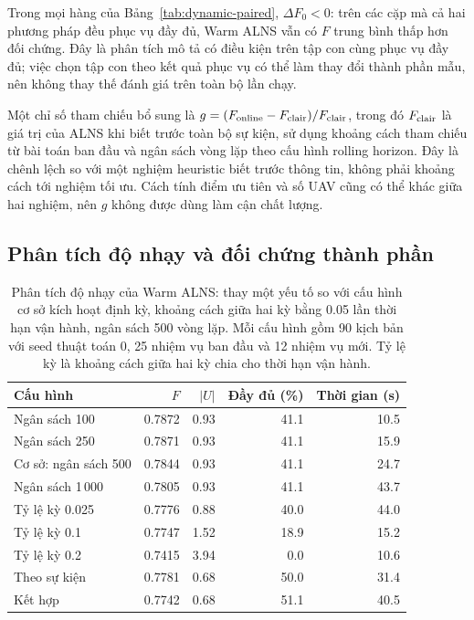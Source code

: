 \documentclass[11pt,a4paper]{article}
\begin{document}
Trong mọi hàng của Bảng~\ref{tab:dynamic-paired}, $\Delta F_0<0$: trên các cặp mà cả hai phương pháp đều phục vụ đầy đủ, Warm ALNS vẫn có $F$ trung bình thấp hơn đối chứng. Đây là phân tích mô tả có điều kiện trên tập con cùng phục vụ đầy đủ; việc chọn tập con theo kết quả phục vụ có thể làm thay đổi thành phần mẫu, nên không thay thế đánh giá trên toàn bộ lần chạy.

Một chỉ số tham chiếu bổ sung là $g=(F_{\rm online}-F_{\rm clair})/F_{\rm clair}$, trong đó $F_{\rm clair}$ là giá trị của ALNS khi biết trước toàn bộ sự kiện, sử dụng khoảng cách tham chiếu từ bài toán ban đầu và ngân sách vòng lặp theo cấu hình rolling horizon. Đây là chênh lệch so với một nghiệm heuristic biết trước thông tin, không phải khoảng cách tới nghiệm tối ưu. Cách tính điểm ưu tiên và số UAV cũng có thể khác giữa hai nghiệm, nên $g$ không được dùng làm cận chất lượng.

\subsection{Phân tích độ nhạy và đối chứng thành phần}
\begin{table}[htbp]
\centering\small
\caption{Phân tích độ nhạy của Warm ALNS: thay một yếu tố so với cấu hình cơ sở kích hoạt định kỳ, khoảng cách giữa hai kỳ bằng 0.05 lần thời hạn vận hành, ngân sách 500 vòng lặp. Mỗi cấu hình gồm 90 kịch bản với seed thuật toán 0, 25 nhiệm vụ ban đầu và 12 nhiệm vụ mới. Tỷ lệ kỳ là khoảng cách giữa hai kỳ chia cho thời hạn vận hành.}
\begin{tabular}{@{}lrrrr@{}}
\toprule
Cấu hình & $F$ & $|U|$ & Đầy đủ (\%) & Thời gian (s)\\\midrule
Ngân sách 100 & 0.7872 & 0.93 & 41.1 & 10.5\\
Ngân sách 250 & 0.7871 & 0.93 & 41.1 & 15.9\\
Cơ sở: ngân sách 500 & 0.7844 & 0.93 & 41.1 & 24.7\\
Ngân sách 1\,000 & 0.7805 & 0.93 & 41.1 & 43.7\\\addlinespace
Tỷ lệ kỳ 0.025 & 0.7776 & 0.88 & 40.0 & 44.0\\
Tỷ lệ kỳ 0.1 & 0.7747 & 1.52 & 18.9 & 15.2\\
Tỷ lệ kỳ 0.2 & 0.7415 & 3.94 & 0.0 & 10.6\\\addlinespace
Theo sự kiện & 0.7781 & 0.68 & 50.0 & 31.4\\
Kết hợp & 0.7742 & 0.68 & 51.1 & 40.5\\
\bottomrule
\end{tabular}
\label{tab:sensitivity}
\end{table}
\end{document}
